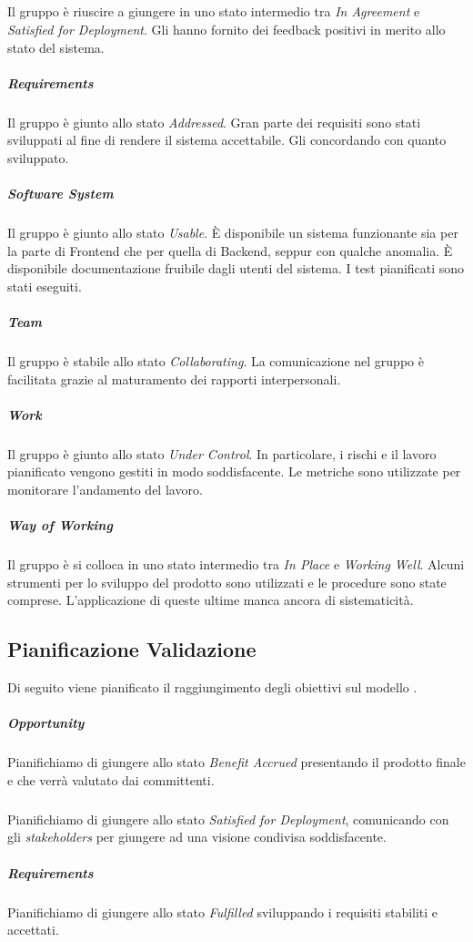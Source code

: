 	\subparagraph{}
	Il gruppo è riuscire a giungere in uno stato intermedio tra \emph{In Agreement} e \emph{Satisfied for Deployment}. Gli  hanno fornito dei feedback positivi in merito allo stato del sistema. %

	\subparagraph{Requirements}
	Il gruppo è giunto allo stato \emph{Addressed}. Gran parte dei requisiti sono stati sviluppati al fine di rendere il sistema accettabile. Gli  concordando con quanto sviluppato.

	\subparagraph{Software System}
	Il gruppo è giunto allo stato \emph{Usable}. \`E disponibile un sistema funzionante sia per la parte di Frontend che per quella di Backend, seppur con qualche anomalia. \`E disponibile documentazione fruibile dagli utenti del sistema. I test pianificati sono stati eseguiti.
 
	\subparagraph{Team}
	Il gruppo è stabile allo stato \emph{Collaborating}. La comunicazione nel gruppo è facilitata grazie al maturamento dei rapporti interpersonali. 

	\subparagraph{Work}
	Il gruppo è giunto allo stato \emph{Under Control}. In particolare, i rischi e il lavoro pianificato vengono gestiti in modo soddisfacente. Le metriche sono utilizzate per monitorare l'andamento del lavoro.

	\subparagraph{Way of Working}
	Il gruppo è si colloca in uno stato intermedio tra \emph{In Place} e \emph{Working Well}. Alcuni strumenti per lo sviluppo del prodotto sono utilizzati e le procedure sono state comprese. L'applicazione di queste ultime manca ancora di sistematicità.

\subsection{Pianificazione Validazione}
Di seguito viene pianificato il raggiungimento degli obiettivi sul modello . 

	\subparagraph{Opportunity}
	Pianifichiamo di giungere allo stato \emph{Benefit Accrued} presentando il prodotto finale e che verrà valutato dai committenti.

	\subparagraph{}
	Pianifichiamo di giungere allo stato \emph{Satisfied for Deployment}, comunicando con gli \emph{stakeholders} per giungere ad una visione condivisa soddisfacente.
	
	\subparagraph{Requirements}
	Pianifichiamo di giungere allo stato \emph{Fulfilled} sviluppando i requisiti stabiliti e accettati.
	
